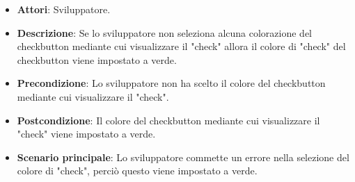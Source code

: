
\FloatBarrier
\begin{itemize}
\item\textbf{Attori}: Sviluppatore.
\item\textbf{Descrizione}: Se lo sviluppatore non seleziona alcuna colorazione del checkbutton mediante cui visualizzare il "check" allora il colore di "check" del checkbutton viene impostato a verde.
\item\textbf{Precondizione}: Lo sviluppatore non ha scelto il colore del checkbutton mediante cui visualizzare il "check".
\item\textbf{Postcondizione}: Il colore del checkbutton mediante cui visualizzare il "check" viene impostato a verde.
\item\textbf{Scenario principale}: Lo sviluppatore commette un errore nella selezione del colore di "check", perciò questo viene impostato a verde. 
\end{itemize}
